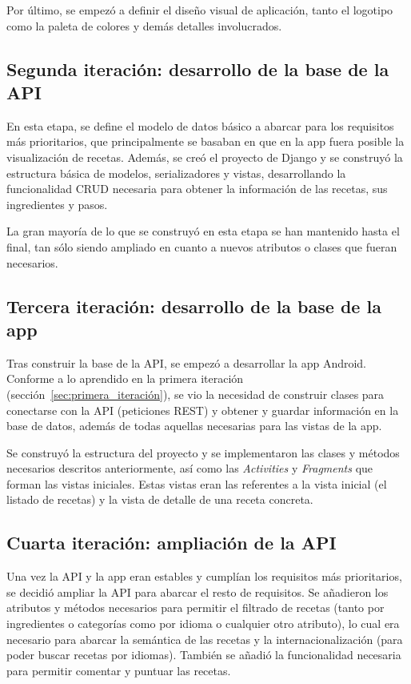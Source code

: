 Por último, se empezó a definir el diseño visual de aplicación, tanto el
logotipo como la paleta de colores y demás detalles involucrados.


\subsection{Segunda iteración: desarrollo de la base de la API}
\label{sec:segunda_iteracion}

En esta etapa, se define el modelo de datos básico a abarcar para los requisitos
más prioritarios, que principalmente se basaban en que en la app fuera posible
la visualización de recetas. Además, se creó el proyecto de Django y se construyó
la estructura básica de modelos, serializadores y vistas, desarrollando la
funcionalidad CRUD necesaria para obtener la información de las recetas, sus
ingredientes y pasos.

La gran mayoría de lo que se construyó en esta etapa se han mantenido hasta el
final, tan sólo siendo ampliado en cuanto a nuevos atributos o clases que fueran
necesarios.


\subsection{Tercera iteración: desarrollo de la base de la app}
\label{sec:tercera_iteracion}

Tras construir la base de la API, se empezó a desarrollar la app Android.
Conforme a lo aprendido en la primera iteración
(sección~\ref{sec:primera_iteración}), se vio la necesidad de construir clases
para conectarse con la API (peticiones REST) y obtener y guardar información en
la base de datos, además de todas aquellas necesarias para las vistas de la app.

Se construyó la estructura del proyecto y se implementaron las clases y métodos
necesarios descritos anteriormente, así como las \textit{Activities} y
\textit{Fragments} que forman las vistas iniciales. Estas vistas eran las
referentes a la vista inicial (el listado de recetas) y la vista de detalle de
una receta concreta.


\subsection{Cuarta iteración: ampliación de la API}
\label{sec:cuarta_iteracion}

Una vez la API y la app eran estables y cumplían los requisitos más prioritarios,
se decidió ampliar la API para abarcar el resto de requisitos. Se añadieron los
atributos y métodos necesarios para permitir el filtrado de recetas (tanto por
ingredientes o categorías como por idioma o cualquier otro atributo), lo cual
era necesario para abarcar la semántica de las recetas y la internacionalización
(para poder buscar recetas por idiomas). También se añadió la funcionalidad
necesaria para permitir comentar y puntuar las recetas.


